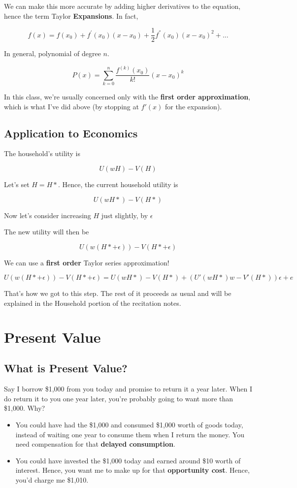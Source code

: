 \documentclass[11pt]{scrartcl}
\begin{document}
We can make this more accurate by adding higher derivatives to the equation, hence the term Taylor \textbf{Expansions}. In fact,

\[ f(x)=f(x_{0})+f^{'}(x_{0})(x-x_{0})+\frac{1}{2}f^{''}(x_{0})(x-x_{0})^{2}+... \]

In general, polynomial of degree $n$.

\[P(x)=\sum_{k=0}^n \frac{f^{(k)}(x_{0})}{k!} (x-x_0)^k \]

In this class, we're usually concerned only with the \textbf{first order approximation}, which is what I've did above (by stopping at $f'(x)$ for the expansion).

\subsection{Application to Economics}

The household's utility is

\[U(wH) - V(H)\]

Let's set $H = H*$. Hence, the current household utility is

\[U(wH*) - V(H*)\]

Now let's consider increasing $H$ just slightly, by $\epsilon$

The new utility will then be

\[U(w(H*+\epsilon)) - V(H*+\epsilon) \]

We can use a \textbf{first order} Taylor series approximation!

\[ U(w(H*+\epsilon)) - V(H*+\epsilon) = U(wH*) - V(H*) + (U' (wH*)w - V'(H*))\epsilon + e\]

That's how we got to this step. The rest of it proceeds as usual and will be explained in the Household portion of the recitation notes.

\section{Present Value}

\subsection{What is Present Value?}

Say I borrow \$1,000 from you today and promise to return it a year later. When I do return it to you one year later, you're probably going to want more than \$1,000. Why?

\begin{itemize}
\item You could have had the \$1,000 and consumed \$1,000 worth of goods today, instead of waiting one year to consume them when I return the money. You need compensation for that \textbf{delayed consumption}.
\item You could have invested the \$1,000 today and earned around \$10 worth of interest. Hence, you want me to make up for that \textbf{opportunity cost}. Hence, you'd charge me \$1,010.
\end{itemize}
\end{document}
